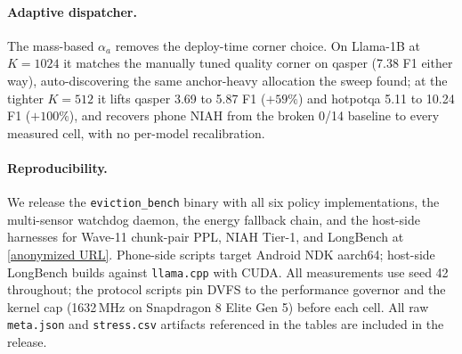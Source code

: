 \documentclass[sigconf, anonymous=false, screen=true]{acmart}
\newcommand{\ub}{\_\allowbreak}
\begin{document}
\paragraph{Adaptive dispatcher.} The mass-based $\alpha_a$ removes the deploy-time corner choice. On Llama-1B at $K{=}1024$ it matches the manually tuned quality corner on qasper (7.38 F1 either way), auto-discovering the same anchor-heavy allocation the sweep found; at the tighter $K{=}512$ it lifts qasper 3.69 to 5.87 F1 ($+59\%$) and hotpotqa 5.11 to 10.24 F1 ($+100\%$), and recovers phone NIAH from the broken 0/14 baseline to every measured cell, with no per-model recalibration.

\paragraph{Reproducibility.} We release the \texttt{eviction\ub bench} binary with all six policy implementations, the multi-sensor watchdog daemon, the energy fallback chain, and the host-side harnesses for Wave-11 chunk-pair PPL, NIAH Tier-1, and LongBench at \url{[anonymized URL]}. Phone-side scripts target Android NDK aarch64; host-side LongBench builds against \texttt{llama.cpp} with CUDA. All measurements use seed 42 throughout; the protocol scripts pin DVFS to the performance governor and the kernel cap (1632\,MHz on Snapdragon 8 Elite Gen 5) before each cell. All raw \texttt{meta.\allowbreak json} and \texttt{stress.\allowbreak csv} artifacts referenced in the tables are included in the release.
\end{document}
